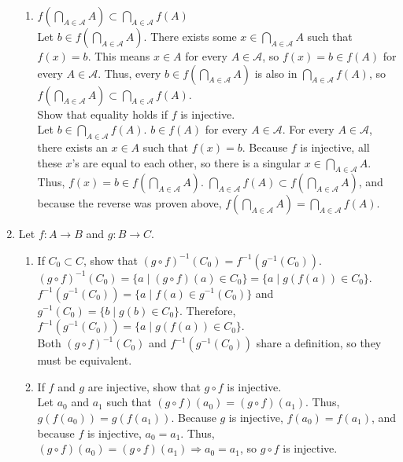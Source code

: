 \documentclass{article}
\begin{document}
\begin{enumerate}
\begin{enumerate}
                  \item $f(\bigcap_{A \in \mathcal{A}} A) \subset \bigcap_{A \in \mathcal{A}} f(A)$\\
                        Let $b \in f(\bigcap_{A \in \mathcal{A}} A)$. There exists some $x \in \bigcap_{A \in \mathcal{A}} A$ such that $f(x) = b$. This means $x \in A$ for every $A \in \mathcal{A}$, so  $f(x) = b \in f(A)$ for every $A \in \mathcal{A}$. Thus, every $b \in f(\bigcap_{A \in \mathcal{A}} A)$ is also in  $\bigcap_{A \in \mathcal{A}} f(A)$, so $f(\bigcap_{A \in \mathcal{A}} A) \subset \bigcap_{A \in \mathcal{A}} f(A)$.\\

                        Show that equality holds if $f$ is injective.\\
                        Let $b \in \bigcap_{A \in \mathcal{A}} f(A)$. $b \in f(A)$ for every $A \in \mathcal{A}$. For every $A \in \mathcal{A}$, there exists an $x \in A$ such that $f(x) = b$. Because $f$ is injective, all these $x$'s are equal to each other, so there is a singular $x \in \bigcap_{A \in \mathcal{A}} A$. Thus, $f(x) = b \in f(\bigcap_{A \in \mathcal{A}} A)$. $\bigcap_{A \in \mathcal{A}} f(A) \subset f(\bigcap_{A \in \mathcal{A}} A)$, and because the reverse was proven above, $f(\bigcap_{A \in \mathcal{A}} A) = \bigcap_{A \in \mathcal{A}} f(A)$.
            \end{enumerate}
      \item Let $f: A \to B$ and $g: B \to C$.
            \begin{enumerate}
                  \item If $C_{0} \subset C$, show that $(g \circ f)^{-1}(C_{0}) = f^{-1}(g^{-1}(C_{0}))$.\\
                        $(g \circ f)^{-1}(C_{0}) = \{a \mid (g \circ f)(a) \in C_{0}\} = \{a \mid g(f(a)) \in C_{0}\}$.\\
                        $f^{-1}(g^{-1}(C_{0})) = \{a \mid  f(a) \in g^{-1}(C_{0})\}$ and $g^{-1}(C_{0}) = \{b \mid g(b) \in C_{0}\}$. Therefore, $f^{-1}(g^{-1}(C_{0})) = \{a \mid g(f(a)) \in C_{0}\}$.\\
                        Both $(g \circ f)^{-1}(C_{0})$ and $f^{-1}(g^{-1}(C_{0}))$ share a definition, so they must be equivalent.
                  \item If $f$ and $g$ are injective, show that $g \circ f$ is injective.\\
                        Let $a_{0}$ and $a_{1}$ such that $(g \circ f)(a_{0}) = (g \circ f)(a_{1})$. Thus, $g(f(a_{0})) = g(f(a_{1}))$. Because $g$ is injective, $f(a_{0}) = f(a_{1})$, and because $f$ is injective, $a_{0} = a_{1}$. Thus, $(g \circ f)(a_{0}) = (g \circ f)(a_{1}) \Rightarrow a_{0} = a_{1}$, so $g \circ f$ is injective.

\end{enumerate}
\end{enumerate}
\end{document}
